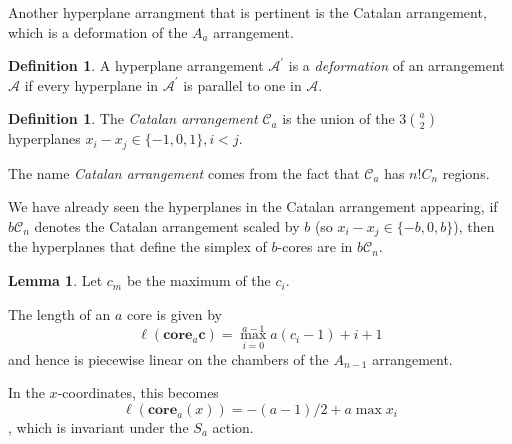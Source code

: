 \documentclass{amsart}[12pt]
\theoremstyle{definition}
\newtheorem{lemma}[dummy]{Lemma}
\newtheorem{definition}[dummy]{Definition}
\newcommand{\core}{\mathbf{core}}
\begin{document}
Another hyperplane arrangment that is pertinent is the Catalan arrangement, which is a deformation of the $A_a$ arrangement.

\begin{definition}
A hyperplane arrangement $\mathcal{A}^\prime$ is a \emph{deformation} of an arrangement $\mathcal{A}$ if every hyperplane in $\mathcal{A}^\prime$ is parallel to one in $\mathcal{A}$.
\end{definition}

\begin{definition}
The \emph{Catalan arrangement} $\mathcal{C}_a$ is the union of the $3\binom{a}{2}$ hyperplanes $x_i-x_j\in\{-1,0,1\}, i<j$.
\end{definition}

The name \emph{Catalan arrangement} comes from the fact that $\mathcal{C}_a$ has $n!C_n$ regions.

We have already seen the hyperplanes in the Catalan arrangement appearing, if $b\mathcal{C}_n$ denotes the Catalan arrangement scaled by $b$ (so $x_i-x_j\in\{-b,0,b\}$), then the hyperplanes that define the simplex of $b$-cores are in $b\mathcal{C}_n$.






\begin{lemma}
Let $c_m$ be the maximum of the $c_i$.

The length of an $a$ core is given by
$$\ell(\core_a{\mathbf{c}})=\max_{i=0}^{a-1} a(c_i-1)+i+1$$
and hence is piecewise linear on the chambers of the $A_{n-1}$ arrangement.

In the $x$-coordinates, this becomes
$$\ell(\core_a(x))=-(a-1)/2+a\max x_i$$,
 which is invariant under the $S_a$ action.
\end{lemma}
\end{document}
